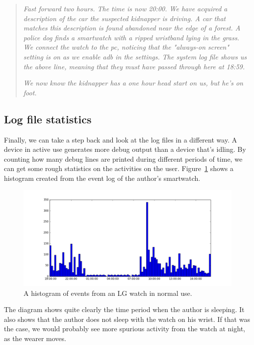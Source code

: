 \documentclass[a4paper,11pt,dvips]{article}
\begin{document}
\begin{quote}
\textit{Fast forward two hours. The time is now 20:00. We have acquired a description of the car the suspected kidnapper is driving. A car that matches this description is found abandoned near the edge of a forest. A police dog finds a smartwatch with a ripped wristband lying in the grass. We connect the watch to the pc, noticing that the "always-on screen" setting is on as we enable adb in the settings. The system log file shows us the above line, meaning that they must have passed through here at 18:59.}

\textit{We now know the kidnapper has a one hour head start on us, but he's on foot.}
\end{quote}


\subsection{Log file statistics}

Finally, we can take a step back and look at the log files in a different way. A device in active use generates more debug output than a device that's idling. By counting how many debug lines are printed during different periods of time, we can get some rough statistics on the activities on the user. Figure~\ref{fig:eventlog} shows a histogram created from the event log of the author's smartwatch.

\begin{figure}
\noindent
\includegraphics[natwidth=1301bp,natheight=600bp,width=\linewidth]{eventlog}
\caption{A histogram of events from an LG watch in normal use.}
\label{fig:eventlog}
\end{figure}

\noindent
The diagram shows quite clearly the time period when the author is sleeping. It also shows that the author does not sleep with the watch on his wrist. If that was the case, we would probably see more spurious activity from the watch at night, as the wearer moves.
\end{document}

